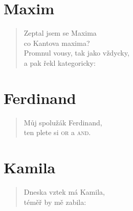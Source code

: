 \section*{Maxim}
\begin{verse}
Zeptal jsem se Maxima\\
co Kantova maxima?\\
Promnul vousy, tak jako vždycky,\\
a pak řekl kategoricky:\\
\end{verse}

\section*{Ferdinand}
\begin{verse}
Můj spolužák Ferdinand,\\
ten plete si \textsc{or} a \textsc{and}.\\
\end{verse}

\section*{Kamila}
\begin{verse}
Dneska vztek má Kamila,\\
téměř by mě zabila:\\
\end{verse}
